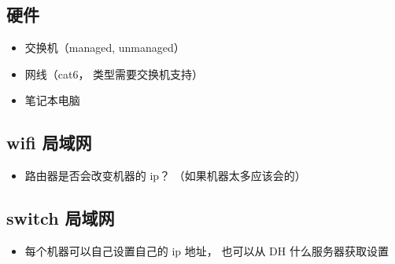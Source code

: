 
\begin{issues}
\issueDraft
\end{issues}

\subsection{硬件}
\begin{itemize}
\item 交换机（managed, unmanaged）
\item 网线（cat6， 类型需要交换机支持）
\item 笔记本电脑
\end{itemize}

\subsection{wifi 局域网}
\begin{itemize}
\item 路由器是否会改变机器的 ip？ （如果机器太多应该会的）
\end{itemize}


\subsection{switch 局域网}
\begin{itemize}
\item 每个机器可以自己设置自己的 ip 地址， 也可以从 DH 什么服务器获取设置
\end{itemize}
